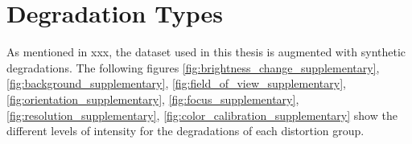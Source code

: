 \section{Degradation Types}
\label{sec:Degradation_Types}
As mentioned in xxx, the dataset used in this thesis is augmented with synthetic degradations. The following figures
\autoref{fig:brightness_change_supplementary}, 
\autoref{fig:background_supplementary}, 
\autoref{fig:field_of_view_supplementary}, 
\autoref{fig:orientation_supplementary}, 
\autoref{fig:focus_supplementary}, 
\autoref{fig:resolution_supplementary}, 
\autoref{fig:color_calibration_supplementary}
  show the different levels of intensity for the degradations of each distortion group. 
\begin{figure}
    \centering
    \setlength{\tabcolsep}{1pt}
    \Large
\end{figure}

